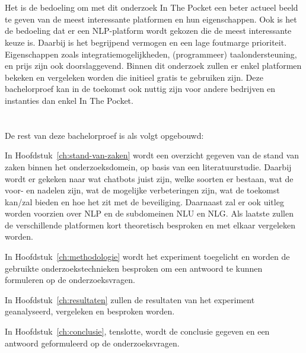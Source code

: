\section{}
\label{sec:onderzoeksdoelstelling}

Het is de bedoeling om met dit onderzoek In The Pocket een beter actueel beeld te geven van de meest interessante platformen en hun eigenschappen. Ook is het de bedoeling dat er een NLP-platform wordt gekozen die de meest interessante keuze is. Daarbij is het begrijpend vermogen en een lage foutmarge prioriteit. Eigenschappen zoals integratiemogelijkheden, (programmeer) taalondersteuning, en prijs zijn ook doorslaggevend. Binnen dit onderzoek zullen er enkel platformen bekeken en vergeleken worden die initieel gratis te gebruiken zijn. Deze bachelorproef kan in de toekomst ook nuttig zijn voor andere bedrijven en instanties dan enkel In The Pocket.

\newpage
\section{}
\label{sec:opzet-bachelorproef}


De rest van deze bachelorproef is als volgt opgebouwd:

In Hoofdstuk~\ref{ch:stand-van-zaken} wordt een overzicht gegeven van de stand van zaken binnen het onderzoeksdomein, op basis van een literatuurstudie.  Daarbij wordt er gekeken naar wat chatbots juist zijn, welke soorten er bestaan, wat de voor- en nadelen zijn, wat de mogelijke verbeteringen zijn, wat de toekomst kan/zal bieden en hoe het zit met de beveiliging. Daarnaast zal er ook uitleg worden voorzien over NLP en de subdomeinen NLU en NLG. Als laatste zullen de verschillende platformen kort theoretisch besproken en met elkaar vergeleken worden.

In Hoofdstuk~\ref{ch:methodologie} wordt het experiment toegelicht en worden de gebruikte onderzoekstechnieken besproken om een antwoord te kunnen formuleren op de onderzoeksvragen.

In Hoofdstuk~\ref{ch:resultaten}  zullen de resultaten van het experiment geanalyseerd, vergeleken en besproken worden.

In Hoofdstuk~\ref{ch:conclusie}, tenslotte, wordt de conclusie gegeven en een antwoord geformuleerd op de onderzoeksvragen.









